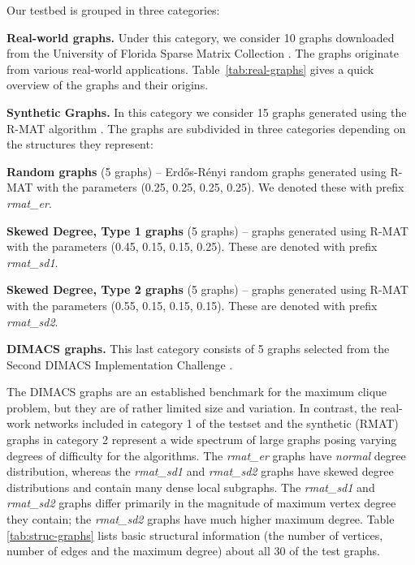 Our testbed is grouped in three categories:\\
\begin{enumerate*}[label=\textbf{\arabic*})]
\item {\bf Real-world graphs. } 
Under this category, we consider 10 graphs downloaded from the 
University of Florida Sparse Matrix Collection  \cite{Davis97theuniversity}. The graphs originate
from various real-world applications. 
Table~\ref{tab:real-graphs} gives a quick overview of the graphs and their origins.\\


\item {\bf Synthetic Graphs. } 
In this category we consider 15 graphs generated using 
the R-MAT algorithm \cite{Chakrabarti:2006:GML:1132952.1132954}. The graphs
are subdivided in three categories depending on the structures they represent:\\

\begin{enumerate*}[label=\textbf{\alph*})]
\item {\bf Random graphs} (5 graphs) -- Erd\H{o}s-R\'{e}nyi random  graphs generated using R-MAT with the parameters (0.25, 0.25, 0.25, 0.25).  We denoted these with prefix {\it rmat\_er}.\\
\item {\bf Skewed Degree, Type 1 graphs} (5 graphs) -- graphs generated using R-MAT with the parameters (0.45, 0.15, 0.15, 0.25). These are denoted with prefix {\it rmat\_sd1}.\\
\item {\bf Skewed Degree, Type 2 graphs} (5 graphs) --  graphs generated using R-MAT with the parameters (0.55, 0.15, 0.15, 0.15). These are denoted with prefix {\it rmat\_sd2}.\\
\end{enumerate*}

\item {\bf DIMACS graphs. } 
This last category consists of 5 graphs selected from the Second DIMACS Implementation Challenge \cite{dimacs}. 

The DIMACS graphs  are an established benchmark for the maximum
clique problem, but they are of rather limited size and variation. 
In contrast, the real-work networks included  in category 1 of the testset
and the synthetic (RMAT) graphs in category 2
represent a wide spectrum of large graphs posing varying degrees of difficulty for the algorithms. 
The {\it rmat\_er} graphs have {\it normal} degree distribution, whereas the {\it rmat\_sd1} and {\it rmat\_sd2} graphs have skewed degree distributions and contain many dense local subgraphs.
 The {\it rmat\_sd1} and {\it rmat\_sd2} graphs differ primarily in the magnitude of maximum vertex degree they contain; the {\it rmat\_sd2} graphs have much higher maximum degree. 
Table \ref{tab:struc-graphs} lists basic structural information (the number of vertices, 
number of edges and the maximum degree) about all 30 of the test graphs.
\end{enumerate*}

